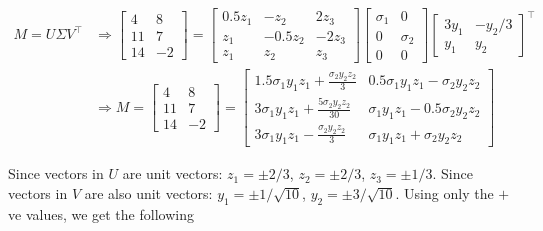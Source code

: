 \begin{align}
    M = U \Sigma V^\top &\Rightarrow \begin{bmatrix}
        4 & 8 \\
        11 & 7 \\
        14 & -2
        \end{bmatrix} = \begin{bmatrix}
        0.5z_1 & -z_2 & 2z_3 \\
        z_1 & -0.5z_2 & -2z_3 \\
        z_1 & z_2 & z_3
        \end{bmatrix} \begin{bmatrix}
        \sigma_1 & 0 \\
        0 & \sigma_2 \\
        0 & 0
        \end{bmatrix} \begin{bmatrix}
        3y_1 & -y_2 / 3 \\
        y_1 & y_2
        \end{bmatrix}^\top
    \nonumber \\
    &\Rightarrow M =
    \begin{bmatrix}
        4 & 8 \\
        11 & 7 \\
        14 & -2
        \end{bmatrix} = \begin{bmatrix}
        1.5 \sigma_1 y_1 z_1 + \frac{\sigma_2 y_2 z_2}{3} & 0.5 \sigma_1 y_1 z_1 - \sigma_2 y_2 z_2 \\
        3 \sigma_1 y_1 z_1 + \frac{5 \sigma_2 y_2 z_2}{30} & \sigma_1 y_1 z_1 - 0.5 \sigma_2 y_2 z_2 \\
        3 \sigma_1 y_1 z_1 - \frac{\sigma_2 y_2 z_2}{3} & \sigma_1 y_1 z_1 + \sigma_2 y_2 z_2
        \end{bmatrix}
    \nonumber
\end{align}

Since vectors in $U$ are unit vectors: $z_1 = \pm 2/3$, $z_2 = \pm 2/3$, $z_3 = \pm 1/3$. Since vectors in $V$ are also unit vectors: $y_1 = \pm 1/\sqrt{10}$, $y_2 = \pm 3/\sqrt{10}$. Using only the $+$ve values, we get the following

